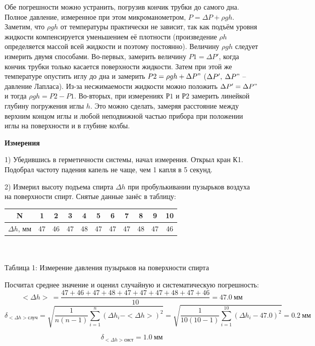 \documentclass[a4paper,12pt]{article} %
\begin{document}
Обе погрешности можно устранить, погрузив кончик трубки до самого дна. Полное давление, измеренное при этом микроманометром, $P = \Delta P + \rho gh$. Заметим, что $\rho gh$ от температуры практически не зависит, так как подъём уровня жидкости компенсируется уменьшением её плотности (произведение $\rho h$ определяется массой всей жидкости и поэтому постоянно). Величину  $\rho gh$ следует измерить двумя способами. Во-первых, замерить величину $P1 = \Delta P'$, когда кончик трубки только касается поверхности жидкости. Затем при этой же температуре опустить иглу до дна и замерить $P2 = \rho gh + \Delta P"$ ($\Delta P' ,\: \Delta P"$ – давление Лапласа). Из-за  несжимаемости  жидкости можно положить $\Delta P' = \Delta P"$ и тогда $\rho gh = P2 -P1$. Во-вторых, при измерениях $Р1$ и $Р2$ замерить линейкой  глубину погружения иглы $h$. Это можно сделать, замеряя расстояние между верхним концом иглы и любой неподвижной частью прибора при положении иглы на поверхности и в глубине колбы.

\begin{center}
	\large{\textbf{Измерения}}
\end{center}

1) Убедившись в герметичности системы, начал измерения. Открыл кран К1. Подобрал частоту падения капель не чаще, чем 1 капля в 5 секунд. 

2) Измерил высоту подъема спирта $\Delta h$  при  пробулькивании пузырьков воздуха на поверхности спирт. Снятые данные занёс в таблицу:

\begin{tabular}{ | c | c | c | c | c | c |c | c | c | c | c | }
\hline
	N              & 1  & 2  & 3  & 4  & 5  & 6  & 7  & 8  & 9  & 10 \\ \hline
	$\Delta h$, мм & 47 & 46 & 47 & 48 & 47 & 47 & 47 & 48 & 47 & 46 \\ \hline
\end{tabular}\\
\setlength{\parskip}{0.3cm}\\
Таблица 1: Измерение давления пузырьков на поверхности спирта

Посчитал среднее значение и оценил случайную и систематическую погрешность: 
\[<\Delta h>\ = \frac{47+46+47+48+47+47+47+48+47+46}{10} = 47.0\ \text{мм}\]
\[\delta_{<\Delta h> \text{случ}} = \sqrt{\frac{1}{n(n-1)}\sum_{i=1}^n(\Delta h_i - <\Delta h>)^2} = \sqrt{\frac{1}{10(10-1)}\sum_{i=1}^{10}(\Delta h_i - 47.0)^2} = 0.2\ \text{мм}\]

\[\delta_{<\Delta h> \text{сист}} = 1.0\ \text{мм}\]
\end{document}
